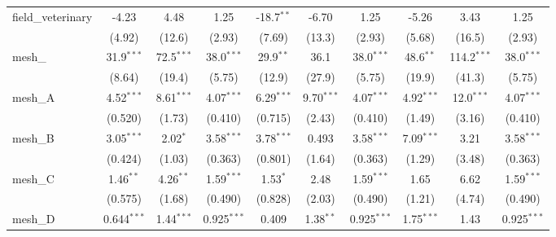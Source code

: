 \begin{tabular}{lccccccccc}
   field\_veterinary                                           & -4.23          & 4.48           & 1.25          & -18.7$^{**}$   & -6.70          & 1.25          & -5.26         & 3.43          & 1.25\\   
                                                               & (4.92)         & (12.6)         & (2.93)        & (7.69)         & (13.3)         & (2.93)        & (5.68)        & (16.5)        & (2.93)\\   
   mesh\_                                                      & 31.9$^{***}$   & 72.5$^{***}$   & 38.0$^{***}$  & 29.9$^{**}$    & 36.1           & 38.0$^{***}$  & 48.6$^{**}$   & 114.2$^{***}$ & 38.0$^{***}$\\   
                                                               & (8.64)         & (19.4)         & (5.75)        & (12.9)         & (27.9)         & (5.75)        & (19.9)        & (41.3)        & (5.75)\\   
   mesh\_A                                                     & 4.52$^{***}$   & 8.61$^{***}$   & 4.07$^{***}$  & 6.29$^{***}$   & 9.70$^{***}$   & 4.07$^{***}$  & 4.92$^{***}$  & 12.0$^{***}$  & 4.07$^{***}$\\   
                                                               & (0.520)        & (1.73)         & (0.410)       & (0.715)        & (2.43)         & (0.410)       & (1.49)        & (3.16)        & (0.410)\\   
   mesh\_B                                                     & 3.05$^{***}$   & 2.02$^{*}$     & 3.58$^{***}$  & 3.78$^{***}$   & 0.493          & 3.58$^{***}$  & 7.09$^{***}$  & 3.21          & 3.58$^{***}$\\   
                                                               & (0.424)        & (1.03)         & (0.363)       & (0.801)        & (1.64)         & (0.363)       & (1.29)        & (3.48)        & (0.363)\\   
   mesh\_C                                                     & 1.46$^{**}$    & 4.26$^{**}$    & 1.59$^{***}$  & 1.53$^{*}$     & 2.48           & 1.59$^{***}$  & 1.65          & 6.62          & 1.59$^{***}$\\   
                                                               & (0.575)        & (1.68)         & (0.490)       & (0.828)        & (2.03)         & (0.490)       & (1.21)        & (4.74)        & (0.490)\\   
   mesh\_D                                                     & 0.644$^{***}$  & 1.44$^{***}$   & 0.925$^{***}$ & 0.409          & 1.38$^{**}$    & 0.925$^{***}$ & 1.75$^{***}$  & 1.43          & 0.925$^{***}$\\   

\end{tabular}
